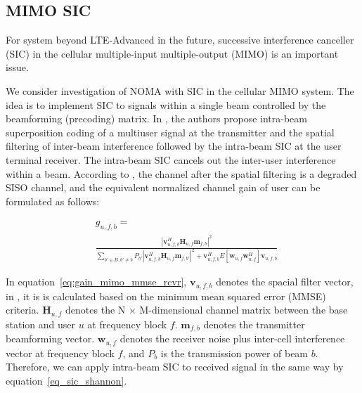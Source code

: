 \subsection{MIMO SIC}
For system beyond LTE-Advanced in the future, successive
interference canceller (SIC) in the cellular multiple-input
multiple-output (MIMO) is an important issue.

We consider investigation of NOMA with SIC in the cellular MIMO system.
The idea is to implement SIC to signals within
a single beam controlled by the beamforming (precoding) matrix.
In \cite{Non-orthogonal_Access_with_Random_Beamforming_and_Intra-beam_SIC_for_Cellular_MIMO_Downlink},
the authors propose intra-beam superposition coding of a multiuser signal at
the transmitter and the spatial filtering of inter-beam
interference followed by the intra-beam SIC at the user terminal
receiver. The intra-beam SIC cancels out the inter-user
interference within a beam.
According to \cite{Non-orthogonal_Access_with_Random_Beamforming_and_Intra-beam_SIC_for_Cellular_MIMO_Downlink},
the channel after the spatial filtering is a degraded SISO
channel, and the equivalent normalized channel gain of user
can be formulated as follows:

\begin{equation}
\label{eq:gain_mimo_mmse_rcvr}
\begin{split}
&g_{u,f,b}= \\
&\frac{|\mathbf{v}^H_{u,f,b} \mathbf{H}_{u,f} \mathbf{m}_{f,b}|^2}{\underset{b'\in B, b'\neq b}{\sum} P_{b'}|\mathbf{v}^H_{u,f,b} \mathbf{H}_{u,f} \mathbf{m}_{f,b'}|^2 + \mathbf{v}^{H}_{u,f,b} E[\mathbf{w}_{u,f} \mathbf{w}^{H}_{u,f}] \mathbf{v}_{u,f,b}}
\end{split}
\end{equation}

In equation~\ref{eq:gain_mimo_mmse_rcvr}, 
$\mathbf{v}_{u,f,b}$ denotes the spacial filter vector, in \cite{Non-orthogonal_Access_with_Random_Beamforming_and_Intra-beam_SIC_for_Cellular_MIMO_Downlink},
it is is calculated based on the minimum mean squared error
(MMSE) criteria.
$\mathbf{H}_{u,f}$ denotes the N $\times$ M-dimensional channel matrix between
the base station and user $u$ at frequency block $f$.
$\mathbf{m}_{f,b}$ denotes the transmitter beamforming vector.
$\mathbf{w}_{u,f}$ denotes the receiver noise plus inter-cell interference
vector at frequency block $f$,
and $P_{b}$ is the transmission power of beam $b$.
Therefore, we can apply intra-beam SIC to received signal in the
same way by equation~\ref{eq_sic_shannon}.


